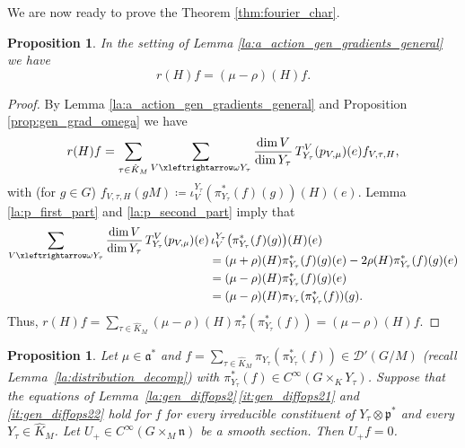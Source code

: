 \documentclass[JEP,XML,SOM,NoFloatCountersInSection,Unicode,published]{cedram}
\newtheorem{proposition}[theorem]{Proposition}
\theoremstyle{definition}
\newcommand{\fourier}[1]{\ensuremath{\sum_{\tau\in\hat K_M}\pi_{Y_\tau}(\pi_{Y_\tau}^*(#1))}}
\newcommand{\lraomega}{\ensuremath{\xleftrightarrow\omega}}
\newcommand{\mc}[1]{\ensuremath{\mathcal{#1}}}
\newcommand{\mf}[1]{\ensuremath{\mathfrak{#1}}}
\newcommand{\rhoa}{\ensuremath{\rho}}
\begin{document}
We are now ready to prove the Theorem \ref{thm:fourier_char}.
\begin{proposition}\label{prop:a_action}
In the setting of Lemma \ref{la:a_action_gen_gradients_general} we have
\[
r(H)f=(\mu-\rhoa)(H)f.
\]
\end{proposition}

\begin{proof}
By Lemma \ref{la:a_action_gen_gradients_general} and Proposition \ref{prop:gen_grad_omega} we have
\[
r(H)f=\sum_{\tau\in\hat K_M}\sum_{V\lraomega Y_\tau}\frac{\dim V}{\dim Y_\tau}\,T_{Y_{\tau}}^V(p_{V,\mu})(e)f_{V,\tau,H},
\]
with (for $g\in G$) $f_{V,\tau,H}(gM)\coloneqq\iota_V^{Y_{\tau}}(\pi_{Y_\tau}^*(f)(g))(H)(e)$.
Lemma \ref{la:p_first_part} and \ref{la:p_second_part} imply that
\begin{align*}
\sum_{V\lraomega Y_\tau}\frac{\dim V}{\dim Y_\tau}\,T_{Y_{\tau}}^V(p_{V,\mu})(e)&\,\iota_V^{Y_{\tau}}\bigl(\pi_{Y_\tau}^*(f)(g)\bigr)(H)(e)\\[-10pt]
&=(\mu+\rhoa)(H)\pi_{Y_\tau}^*(f)(g)(e)-2\rhoa(H)\pi_{Y_\tau}^*(f)(g)(e)\\
&=(\mu-\rhoa)(H)\pi_{Y_\tau}^*(f)(g)(e)\\
&=(\mu-\rhoa)(H)\pi_{Y_\tau}(\pi_{Y_\tau}^*(f))(g).
\end{align*}
Thus, $r(H)f=\sum_{\tau\in\hat K_M}(\mu-\rhoa)(H)\pi_{\tau}^*(\pi_{Y_\tau}^*(f))=(\mu-\rhoa)(H)f$.
\end{proof}

\begin{proposition}\label{prop:n_action}
Let $\mu\in\mf a^*$ and $f=\fourier{f}\in\mc D'(G/M)$ (\hbox{recall} Lem\-ma~\ref{la:distribution_decomp}) with $\pi_{Y_\tau}^*(f)\in C^\infty(G\times_KY_\tau)$. Suppose that the equations of Lem\-ma~\ref{la:gen_diffops2}\,\eqref{it:gen_diffops21} and \eqref{it:gen_diffops22} hold for $f$ for every irreducible constituent of $Y_\tau\otimes\mf p^*$ and every $Y_\tau\in\hat K_M$. Let $U_+\in C^\infty(G\times_M\mf n)$ be a smooth section. Then $U_+f=0$.
\end{proposition}
\end{document}
